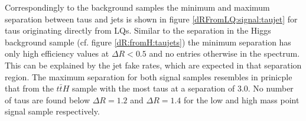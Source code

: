 %
Correspondingly to the background samples the minimum and maximum separation between taus and jets is shown in figure \ref{dRFromLQ:signal:taujet} for taus originating directly from LQs. Similar to the separation in the Higgs background sample (cf. figure \ref{dR:fromH:taujets}) the minimum separation has only high efficiency values at $\Delta R<0.5$ and no entries otherwise in the spectrum. This can be explained by the jet fake rates, which are expected in that separation region. The maximum separation for both signal samples resembles in prinicple that from the $t\bar{t}H$ sample with the most taus at a separation of $3.0$. No number of taus are found below $\Delta R=1.2$ and $\Delta R=1.4$ for the low and high mass point signal sample respectively. \newline
%
%
%
